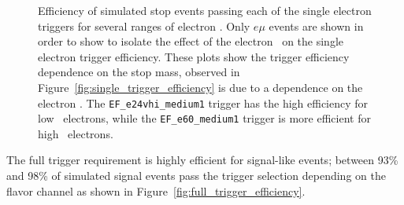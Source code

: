 \begin{figure}[ht]
  \centering
  \caption{Efficiency of simulated stop events passing each of the single
    electron triggers for several ranges of electron \ET.
    Only $e\mu$ events are shown in order to show to isolate the effect of
    the electron \ET\ on the single electron trigger efficiency.
    These plots show the trigger efficiency dependence on the stop mass,
    observed in Figure~\ref{fig:single_trigger_efficiency} is due to a
    dependence on the electron \HT.
    The \texttt{EF\_e24vhi\_medium1} trigger has the high efficiency for low
    \HT\ electrons, while the \texttt{EF\_e60\_medium1} trigger is more
    efficient for high \HT\ electrons.
  }
  \label{fig:electron_trigger_pt_dependence}
\end{figure}

The full trigger requirement is highly efficient for signal-like events; between
93\% and 98\% of simulated signal events pass the trigger selection depending
on the flavor channel as shown in Figure~\ref{fig:full_trigger_efficiency}.

